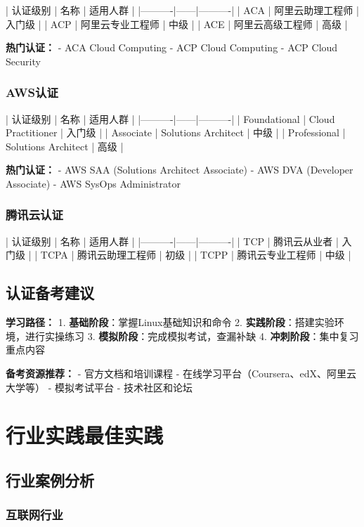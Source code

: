 \documentclass[12pt,UTF8]{ctexbook}
\begin{document}
| 认证级别 | 名称 | 适用人群 |
|----------|------|----------|
| ACA | 阿里云助理工程师 | 入门级 |
| ACP | 阿里云专业工程师 | 中级 |
| ACE | 阿里云高级工程师 | 高级 |

\textbf{热门认证：}
- ACA Cloud Computing
- ACP Cloud Computing
- ACP Cloud Security

\subsubsection*{AWS认证}

| 认证级别 | 名称 | 适用人群 |
|----------|------|----------|
| Foundational | Cloud Practitioner | 入门级 |
| Associate | Solutions Architect | 中级 |
| Professional | Solutions Architect | 高级 |

\textbf{热门认证：}
- AWS SAA (Solutions Architect Associate)
- AWS DVA (Developer Associate)
- AWS SysOps Administrator

\subsubsection*{腾讯云认证}

| 认证级别 | 名称 | 适用人群 |
|----------|------|----------|
| TCP | 腾讯云从业者 | 入门级 |
| TCPA | 腾讯云助理工程师 | 初级 |
| TCPP | 腾讯云专业工程师 | 中级 |

\subsection*{认证备考建议}

\textbf{学习路径：}
1. \textbf{基础阶段}：掌握Linux基础知识和命令
2. \textbf{实践阶段}：搭建实验环境，进行实操练习
3. \textbf{模拟阶段}：完成模拟考试，查漏补缺
4. \textbf{冲刺阶段}：集中复习重点内容

\textbf{备考资源推荐：}
- 官方文档和培训课程
- 在线学习平台（Coursera、edX、阿里云大学等）
- 模拟考试平台
- 技术社区和论坛

\section{行业实践最佳实践}
\label{sec:industry-best-practices}

\subsection*{行业案例分析}

\subsubsection*{互联网行业}
\end{document}
